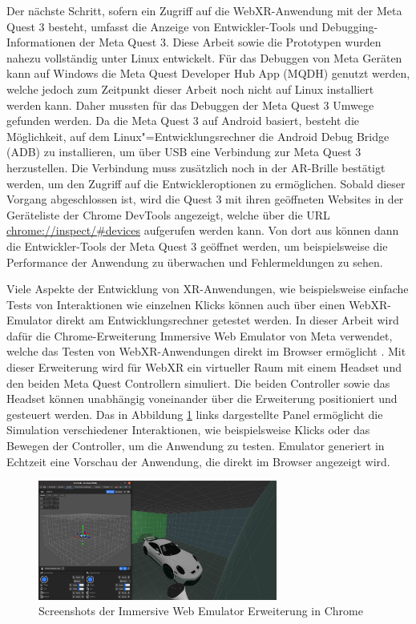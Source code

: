 Der nächste Schritt, sofern ein Zugriff auf die WebXR-Anwendung mit der Meta Quest 3 besteht, umfasst die Anzeige von Entwickler-Tools und Debugging-Informationen der Meta Quest 3.
Diese Arbeit sowie die Prototypen wurden nahezu vollständig unter Linux entwickelt.
Für das Debuggen von Meta Geräten kann auf Windows die Meta Quest Developer Hub App (MQDH) genutzt werden, welche jedoch zum Zeitpunkt dieser Arbeit noch nicht auf Linux installiert werden kann.
Daher mussten für das Debuggen der Meta Quest 3 Umwege gefunden werden. \newline
Da die Meta Quest 3 auf Android basiert, besteht die Möglichkeit, auf dem Linux"=Entwicklungsrechner die Android Debug Bridge (ADB) zu installieren, um über USB eine Verbindung zur Meta Quest 3 herzustellen.
Die Verbindung muss zusätzlich noch in der AR-Brille bestätigt werden, um den Zugriff auf die Entwickleroptionen zu ermöglichen.
Sobald dieser Vorgang abgeschlossen ist, wird die Quest 3 mit ihren geöffneten Websites in der Geräteliste der Chrome DevTools angezeigt, welche über die URL \url{chrome://inspect/#devices} aufgerufen werden kann.
Von dort aus können dann die Entwickler-Tools der Meta Quest 3 geöffnet werden, um beispielsweise die Performance der Anwendung zu überwachen und Fehlermeldungen zu sehen.

Viele Aspekte der Entwicklung von XR-Anwendungen, wie beispielsweise einfache Tests von Interaktionen wie einzelnen Klicks können auch über einen WebXR-Emulator direkt am Entwicklungsrechner getestet werden.
In dieser Arbeit wird dafür die Chrome-Erweiterung Immersive Web Emulator von Meta verwendet, welche das Testen von WebXR-Anwendungen direkt im Browser ermöglicht \autocite{immersive-web-emulator}.
Mit dieser Erweiterung wird für WebXR ein virtueller Raum mit einem Headset und den beiden Meta Quest Controllern simuliert.
Die beiden Controller sowie das Headset können unabhängig voneinander über die Erweiterung positioniert und gesteuert werden.
Das in Abbildung \ref{fig:webxr-emulator} links dargestellte Panel ermöglicht die Simulation verschiedener Interaktionen, wie beispielsweise Klicks oder das Bewegen der Controller, um die Anwendung zu testen.
Emulator generiert in Echtzeit eine Vorschau der Anwendung, die direkt im Browser angezeigt wird.

\begin{figure}[H]
    \centering
    \includegraphics[width=0.7\textwidth]{images/WebXR-Emulator.png}
    \caption{Screenshots der Immersive Web Emulator Erweiterung in Chrome}
    \label{fig:webxr-emulator}
\end{figure}

